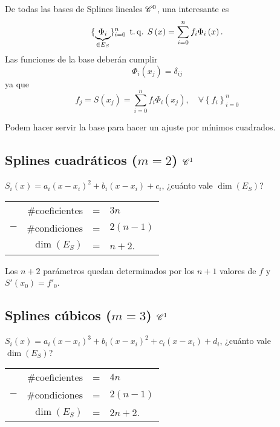De todas las bases de Splines lineales $\mathscr{C}^0$, una interesante es
\[
    \{ \underbrace{\Phi_i}_{\in E_S} \}_{i=0}^n \operatorname{\;t.q.\;} S\left( x \right) = \sum_{i=0}^n f_i\Phi_i\left( x \right).
\]
Las funciones de la base deberán cumplir
\[
    \Phi_i\left( x_j \right) = \delta_{ij}
\]
ya que
\[
    f_j = S\left( x_j \right) = \sum_{i=0}^n f_i\Phi_i\left( x_j \right),\quad \forall \left\{ f_i \right\}_{i=0}^n
\]

\begin{obs}
    Podem hacer servir la base para hacer un ajuste por mínimos cuadrados.
\end{obs}

\subsection{Splines cuadráticos ($m=2$) $\mathscr{C}^1$}

$S_i\left( x \right) = a_i\left( x-x_i \right)^2 + b_i \left( x-x_i \right) + c_i$, ¿cuánto vale $\dim\left( E_S \right)$?

\begin{center}
    \begin{tabular}{crcl}
        & $\#$coeficientes &=& $3n$\\
        $-$ & $\#$condiciones &=& $2\left( n-1\right)$\\\hline
        &$\dim\left( E_S \right)$ &=& $n+2$.
    \end{tabular}
\end{center}

Los $n+2$ parámetros quedan determinados por los $n+1$ valores de $f$ y $S'\left( x_0 \right) = f'_0$.

\subsection{Splines cúbicos ($m=3$) $\mathscr{C}^1$}

$S_i\left( x \right) = a_i\left( x-x_i \right)^3 + b_i \left( x-x_i \right)^2 + c_i\left( x-x_i \right) + d_i$, ¿cuánto vale $\dim\left( E_S \right)$?

\begin{center}
    \begin{tabular}{crcl}
        & $\#$coeficientes &=& $4n$\\
        $-$ & $\#$condiciones &=& $2\left( n-1\right)$\\\hline
        &$\dim\left( E_S \right)$ &=& $2n+2$.
    \end{tabular}
\end{center}

